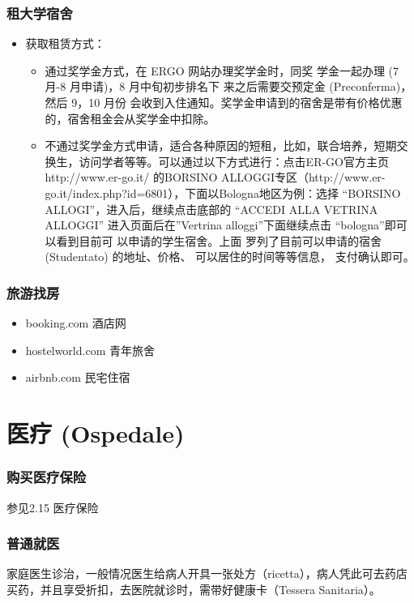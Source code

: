 \subsubsection{租大学宿舍}
\begin{itemize}
\item 获取租赁方式：
	\begin{itemize}
		\item 通过奖学金方式，在 ERGO 网站办理奖学金时，同奖 
学金一起办理 (7 月-8 月申请)，8 月中旬初步排名下 
来之后需要交预定金 (Preconferma)，然后 9，10 月份 
会收到入住通知。奖学金申请到的宿舍是带有价格优惠 
的，宿舍租金会从奖学金中扣除。

		\item 不通过奖学金方式申请，适合各种原因的短租，比如，联合培养，短期交换生，访问学者等等。可以通过以下方式进行：点击ER-GO官方主页 http://www.er-go.it/ 的BORSINO ALLOGGI专区（http://www.er-go.it/index.php?id=6801），下面以Bologna地区为例：选择 “BORSINO ALLOGI”，进入后，继续点击底部的 
“ACCEDI ALLA VETRINA ALLOGGI”
进入页面后在”Vertrina alloggi”下面继续点击
“bologna”即可以看到目前可 以申请的学生宿舍。上面
罗列了目前可以申请的宿舍 (Studentato) 的地址、价格、
可以居住的时间等等信息， 
支付确认即可。

	\end{itemize} 
\end{itemize} 

\subsubsection{旅游找房}
\begin{itemize}
\item booking.com 酒店网
\item hostelworld.com 青年旅舍
\item airbnb.com 民宅住宿
\end{itemize} 


\section{医疗 (Ospedale)}


\subsubsection{购买医疗保险}
参见2.15 医疗保险 

\subsubsection{普通就医}
家庭医生诊治，一般情况医生给病人开具一张处方（ricetta），病人凭此可去药店买药，并且享受折扣，去医院就诊时，需带好健康卡（Tessera Sanitaria）。
